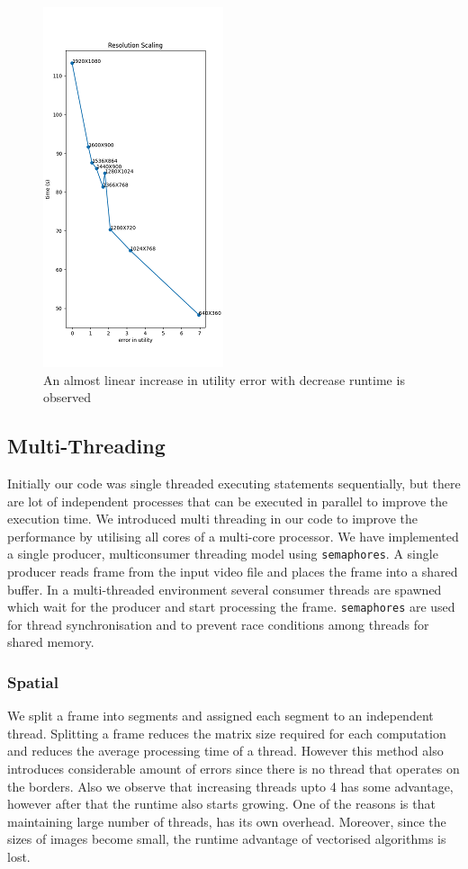 \documentclass[conference]{IEEEtran}
\begin{document}
\begin{figure}[htbp]
\centerline{\includegraphics{plots/plot_resolution.png}}
\caption{An almost linear increase in utility error with decrease runtime is observed}
\label{res_evt} 
\end{figure}
    

\subsection{Multi-Threading}
Initially our code was single threaded executing statements sequentially, but there are lot of independent processes that can be executed in parallel to improve the execution time.
We introduced multi threading in our code to improve the performance by utilising all cores of a multi-core processor. We have implemented a single producer, multiconsumer threading model using \verb|semaphores|.
A single producer reads frame from the input video file and places the frame into a shared buffer. In a multi-threaded environment several consumer threads are spawned which wait for the
producer and start processing the frame. \verb|semaphores| are used for thread synchronisation and to prevent race conditions among threads for shared memory.

\subsubsection{Spatial} 
We split a frame into segments and assigned each segment to an independent thread. Splitting a frame reduces the matrix size required for each computation and reduces the
average processing time of a thread. However this method also introduces considerable amount of errors since there is no thread that operates on the borders.
Also we observe that increasing threads upto 4 has some advantage, however after that the runtime also starts growing. One of the reasons is that maintaining large number of threads,
has its own overhead. Moreover, since the sizes of images become small, the runtime advantage of vectorised algorithms is lost.
\end{document}
